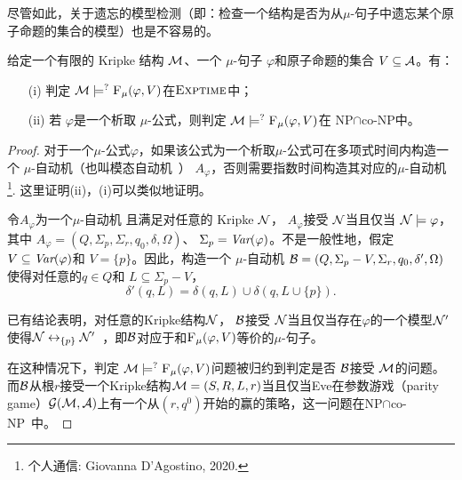 尽管如此，关于遗忘的模型检测（即：检查一个结构是否为从$\mu$-句子中遗忘某个原子命题的集合的模型）也是不容易的。
\begin{proposition}[模型检测]\label{chapter06:pro:MC}
	给定一个有限的 Kripke 结构  ${\cal M}$、一个 $\mu$-句子 $\varphi$和原子命题的集合 $V\subseteq {\cal A}$。有：
	\begin{itemize}
		\item[(i)] 判定 ${\cal M} \models^? {\textsc{F}_{\textsc{$\mu$}}}(\varphi, V)$在$\textsc{Exptime}$中；
		\item[(ii)] 若 $\varphi$是一个析取 $\mu$-公式，则判定 ${\cal M} \models^? {\textsc{F}_{\textsc{$\mu$}}}(\varphi, V)$在 \textsc{NP}$\cap$co-\textsc{NP}中。
	\end{itemize}
\end{proposition}
\begin{proof}
	对于一个$\mu$-公式$\varphi$，如果该公式为一个析取$\mu$-公式可在多项式时间内构造一个 $\mu$-自动机（也叫模态自动机~\cite{bradfield2018mu}） $A_{\varphi}$，否则需要指数时间构造其对应的$\mu$-自动机\footnote{个人通信: Giovanna D'Agostino, 2020.}.
	这里证明(ii)，(i)可以类似地证明。
	
	令$A_{\varphi}$为一个$\mu$-自动机 且满足对任意的 Kripke ${\cal N}$， %
	$A_{\varphi}$接受 ${\cal N}$当且仅当 ${\cal N} \models \varphi$，其中 $A_{\varphi} = (Q, \Sigma_p, \Sigma_r, q_0, \delta, \Omega)$、 $\Sigma_p = \textit{Var}(\varphi)$。不是一般性地，假定$V \subseteq \textit{Var}(\varphi)$和 $V=\{p\}$。因此，构造一个 $\mu$-自动机 ${\cal B}= (Q, \Sigma_p - V, \Sigma_r, q_0, \delta', \Omega)$使得对任意的$q\in Q$和 $L\subseteq \Sigma_p - V$，
	\[
	\delta'(q, L) = \delta(q, L) \cup \delta(q, L \cup \{p\}).
	\]
	
	已有结论表明，对任意的Kripke结构${\cal N}$， ${\cal B}$接受 ${\cal N}$当且仅当存在$\varphi$的一个模型${\cal N}'$使得${\cal N} \leftrightarrow_{\{p\}} {\cal N}'$~\cite{d1996uniform}，即${\cal B}$对应于和${\textsc{F}_{\textsc{$\mu$}}}(\varphi, V)$等价的$\mu$-句子。
	
	
	在这种情况下，判定 ${\cal M} \models^? {\textsc{F}_{\textsc{$\mu$}}}(\varphi, V)$问题被归约到判定是否 ${\cal B}$接受 ${\cal M}$的问题。
	而${\cal B}$从根$r$接受一个Kripke结构${\cal M}=(S, R,L, r)$当且仅当Eve在参数游戏（parity game）${\cal G}({\cal M}, {\cal A})$上有一个从$(r,q^0)$开始的赢的策略，这一问题在\textsc{NP}$\cap$co-\textsc{NP}~\cite{bradfield2018mu}中。
\end{proof}

